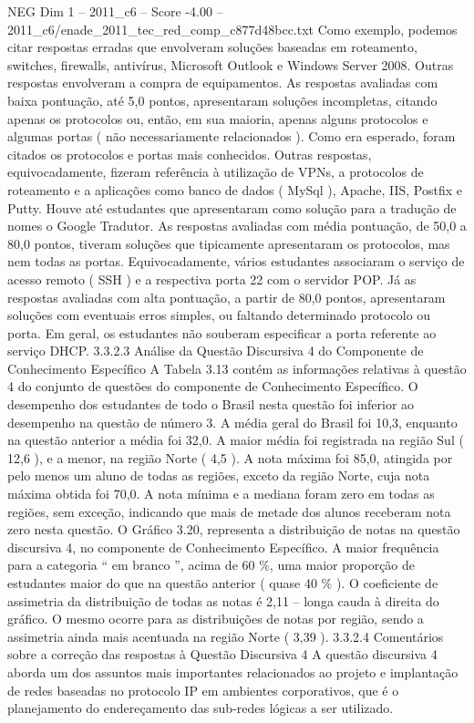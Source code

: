 \begin{textsample}{NEG Dim 1 – 2011\_c6 – Score -4.00 – 2011\_c6/enade\_2011\_tec\_red\_comp\_c877d48bcc.txt}
Como exemplo, podemos citar respostas erradas que envolveram soluções baseadas em roteamento, switches, firewalls, antivírus, Microsoft Outlook e Windows Server 2008.
Outras respostas envolveram a compra de equipamentos.
As respostas avaliadas com baixa pontuação, até 5,0 pontos, apresentaram soluções incompletas, citando apenas os protocolos ou, então, em sua maioria, apenas alguns protocolos e algumas portas ( não necessariamente relacionados ).
Como era esperado, foram citados os protocolos e portas mais conhecidos.
Outras respostas, equivocadamente, fizeram referência à utilização de VPNs, a protocolos de roteamento e a aplicações como banco de dados ( MySql ), Apache, IIS, Postfix e Putty.
Houve até estudantes que apresentaram como solução para a tradução de nomes o Google Tradutor.
As respostas avaliadas com média pontuação, de 50,0 a 80,0 pontos, tiveram soluções que tipicamente apresentaram os protocolos, mas nem todas as portas.
Equivocadamente, vários estudantes associaram o serviço de acesso remoto ( SSH ) e a respectiva porta 22 com o servidor POP.
Já as respostas avaliadas com alta pontuação, a partir de 80,0 pontos, apresentaram soluções com eventuais erros simples, ou faltando determinado protocolo ou porta.
Em geral, os estudantes não souberam especificar a porta referente ao serviço DHCP. 3.3.2.3 Análise da Questão Discursiva 4 do Componente de Conhecimento Específico A Tabela 3.13 contém as informações relativas à questão 4 do conjunto de questões do componente de Conhecimento Específico.
O desempenho dos estudantes de todo o Brasil nesta questão foi inferior ao desempenho na questão de número 3.
A média geral do Brasil foi 10,3, enquanto na questão anterior a média foi 32,0.
A maior média foi registrada na região Sul ( 12,6 ), e a menor, na região Norte ( 4,5 ).
A nota máxima foi 85,0, atingida por pelo menos um aluno de todas as regiões, exceto da região Norte, cuja nota máxima obtida foi 70,0.
A nota mínima e a mediana foram zero em todas as regiões, sem exceção, indicando que mais de metade dos alunos receberam nota zero nesta questão.
O Gráfico 3.20, representa a distribuição de notas na questão discursiva 4, no componente de Conhecimento Específico.
A maior frequência para a categoria “ em branco ”, acima de 60 \%, uma maior proporção de estudantes maior do que na questão anterior ( quase 40 \% ).
O coeficiente de assimetria da distribuição de todas as notas é 2,11 – longa cauda à direita do gráfico.
O mesmo ocorre para as distribuições de notas por região, sendo a assimetria ainda mais acentuada na região Norte ( 3,39 ). 3.3.2.4 Comentários sobre a correção das respostas à Questão Discursiva 4 A questão discursiva 4 aborda um dos assuntos mais importantes relacionados ao projeto e implantação de redes baseadas no protocolo IP em ambientes corporativos, que é o planejamento do endereçamento das sub-redes lógicas a ser utilizado.

\end{textsample}
